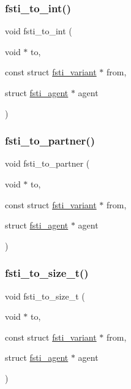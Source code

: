 \mbox{\label{fsti-events_8c_ae5bb2a1c874126eca3ed12115e22360a}} 
\subsubsection{\texorpdfstring{fsti\+\_\+to\+\_\+int()}{fsti\_to\_int()}}
{\footnotesize\ttfamily void fsti\+\_\+to\+\_\+int (\begin{DoxyParamCaption}\item[{void $\ast$}]{to,  }\item[{const struct \mbox{\hyperlink{structfsti__variant}{fsti\+\_\+variant}} $\ast$}]{from,  }\item[{struct \mbox{\hyperlink{structfsti__agent}{fsti\+\_\+agent}} $\ast$}]{agent }\end{DoxyParamCaption})}

\mbox{\label{fsti-events_8c_aad5bd92a57743b08d6c9eb5bac33c78b}} 
\subsubsection{\texorpdfstring{fsti\+\_\+to\+\_\+partner()}{fsti\_to\_partner()}}
{\footnotesize\ttfamily void fsti\+\_\+to\+\_\+partner (\begin{DoxyParamCaption}\item[{void $\ast$}]{to,  }\item[{const struct \mbox{\hyperlink{structfsti__variant}{fsti\+\_\+variant}} $\ast$}]{from,  }\item[{struct \mbox{\hyperlink{structfsti__agent}{fsti\+\_\+agent}} $\ast$}]{agent }\end{DoxyParamCaption})}

\mbox{\label{fsti-events_8c_ace7211e8e83bb5273066bc5fe50585a6}} 
\subsubsection{\texorpdfstring{fsti\+\_\+to\+\_\+size\+\_\+t()}{fsti\_to\_size\_t()}}
{\footnotesize\ttfamily void fsti\+\_\+to\+\_\+size\+\_\+t (\begin{DoxyParamCaption}\item[{void $\ast$}]{to,  }\item[{const struct \mbox{\hyperlink{structfsti__variant}{fsti\+\_\+variant}} $\ast$}]{from,  }\item[{struct \mbox{\hyperlink{structfsti__agent}{fsti\+\_\+agent}} $\ast$}]{agent }\end{DoxyParamCaption})}

